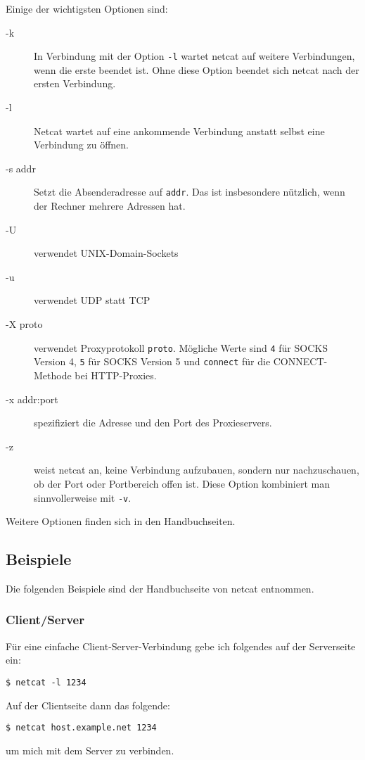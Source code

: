 \begin{normaltext}
  Einige der wichtigsten Optionen sind:
  \begin{description}
    \item[-k] In Verbindung mit der Option \verb?-l? wartet netcat auf weitere
      Verbindungen, wenn die erste beendet ist. Ohne diese Option beendet sich
      netcat nach der ersten Verbindung.
    \item[-l] Netcat wartet auf eine ankommende Verbindung anstatt selbst eine
      Verbindung zu öffnen.
    \item[-s addr] Setzt die Absenderadresse auf \verb?addr?. Das ist
      insbesondere nützlich, wenn der Rechner mehrere Adressen hat.
    \item[-U] verwendet UNIX-Domain-Sockets
    \item[-u] verwendet UDP statt TCP
    \item[-X proto] verwendet Proxyprotokoll \verb?proto?. Mögliche Werte sind
      \verb?4? für SOCKS Version 4, \verb?5? für SOCKS Version 5 und
      \verb?connect? für die CONNECT-Methode bei HTTP-Proxies.
    \item[-x addr:port] spezifiziert die Adresse und den Port des
      Proxieservers.
    \item[-z] weist netcat an, keine Verbindung aufzubauen, sondern nur
      nachzuschauen, ob der Port oder Portbereich offen ist. Diese Option
      kombiniert man sinnvollerweise mit \verb?-v?.
  \end{description}
  Weitere Optionen finden sich in den Handbuchseiten.

  \subsection*{Beispiele}

  Die folgenden Beispiele sind der Handbuchseite von netcat entnommen.

  \subsubsection*{Client/Server}
  Für eine einfache Client-Server-Verbindung gebe ich folgendes auf der
  Serverseite ein:
  \begin{verbatim}
$ netcat -l 1234
  \end{verbatim}
  Auf der Clientseite dann das folgende:
  \begin{verbatim}
$ netcat host.example.net 1234
  \end{verbatim}
  um mich mit dem Server zu verbinden.


\end{normaltext}
